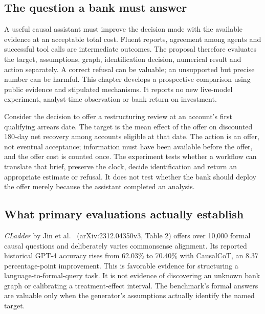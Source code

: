 \label{exec14:evaluation-development}

\hypertarget{the-question-a-bank-must-answer}{%
\subsection{The question a bank must
answer}\label{the-question-a-bank-must-answer}}

A useful causal assistant must improve the decision made with the
available evidence at an acceptable total cost. Fluent reports,
agreement among agents and successful tool calls are intermediate
outcomes. The proposal therefore evaluates the target, assumptions,
graph, identification decision, numerical result and action separately.
A correct refusal can be valuable; an unsupported but precise number can
be harmful. This chapter develops a prospective comparison using public
evidence and stipulated mechanisms. It reports no new live-model
experiment, analyst-time observation or bank return on investment.

Consider the decision to offer a restructuring review at an account's
first qualifying arrears date. The target is the mean effect of the
offer on discounted 180-day net recovery among accounts eligible at that
date. The action is an offer, not eventual acceptance; information must
have been available before the offer, and the offer cost is counted
once. The experiment tests whether a workflow can translate that brief,
preserve the clock, decide identification and return an appropriate
estimate or refusal. It does not test whether the bank should deploy the
offer merely because the assistant completed an analysis.

\hypertarget{what-primary-evaluations-actually-establish}{%
\subsection{What primary evaluations actually
establish}\label{what-primary-evaluations-actually-establish}}

\emph{CLadder} by Jin et al.~\citep{v12_la_2312_04350}
(arXiv:2312.04350v3, Table 2) offers over 10,000 formal causal questions
and deliberately varies commonsense alignment. Its reported historical
GPT-4 accuracy rises from 62.03\% to 70.40\% with CausalCoT, an 8.37
percentage-point improvement. This is favorable evidence for structuring
a language-to-formal-query task. It is not evidence of discovering an
unknown bank graph or calibrating a treatment-effect interval. The
benchmark's formal answers are valuable only when the generator's
assumptions actually identify the named target.

